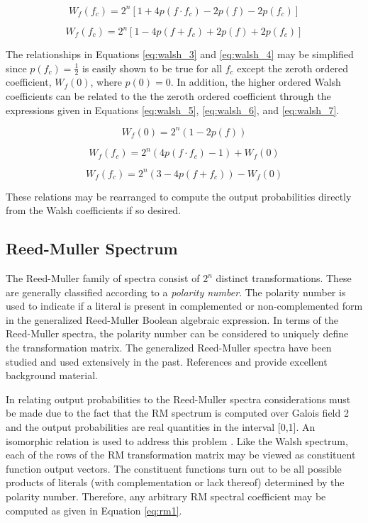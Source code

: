 \begin{equation}
W_f(f_c) = 2^n[1+4p(f \cdot f_c)-2p(f)-2p(f_c)] \label{eq:walsh_3}
\end{equation}

\begin{equation}
W_f(f_c) = 2^n[1-4p(f + f_c)+2p(f)+2p(f_c)] \label{eq:walsh_4}
\end{equation}

The relationships in Equations \ref{eq:walsh_3} and \ref{eq:walsh_4} may be simplified 
since $p(f_c)=\frac{1}{2}$ is easily shown to be true for all $f_c$ except
the zeroth ordered coefficient, $W_f(0)$, where $p(0)=0$.  In addition, the 
higher ordered Walsh coefficients can be related to the the zeroth ordered coefficient
through the expressions given in Equations \ref{eq:walsh_5},  \ref{eq:walsh_6}, and
\ref{eq:walsh_7}.

\begin{equation}
W_f(0)=2^n(1-2p(f))     \label{eq:walsh_5}
\end{equation}

\begin{equation}
W_f(f_c) = 2^n ( 4p(f \cdot f_c) - 1) + W_f(0)    \label{eq:walsh_6}
\end{equation}

\begin{equation}
W_f(f_c)=2^n(3-4p(f + f_c))-W_f(0)    \label{eq:walsh_7}
\end{equation}

These relations may be rearranged to compute the output probabilities directly from
the Walsh coefficients if so desired.

\subsection{Reed-Muller Spectrum}
The Reed-Muller family of spectra consist of $2^n$ distinct transformations.
These are generally classified according to a {\em polarity number}.  The polarity
number is used to indicate if a literal is present in complemented or non-complemented
form in the generalized Reed-Muller Boolean algebraic expression. In terms of the
Reed-Muller spectra, the polarity number can be considered to uniquely define the
transformation matrix.  The generalized Reed-Muller spectra have been studied
and used extensively in the past.  References \cite{DDT78} and \cite{DG86} provide
excellent background material.

In relating output probabilities to the Reed-Muller spectra considerations must
be made due to the fact that the RM spectrum is computed over Galois field 2 and
the output probabilities are real quantities in the interval [0,1].  An isomorphic
relation is used to address this problem \cite{TN95b}.  Like the
Walsh spectrum, each of the rows of the RM transformation matrix may be viewed as
constituent function output vectors.  The constituent functions turn out to be
all possible products of literals (with complementation or lack thereof) determined
by the polarity number.  Therefore, any arbitrary RM spectral coefficient may
be computed as given in Equation \ref{eq:rm1}.

